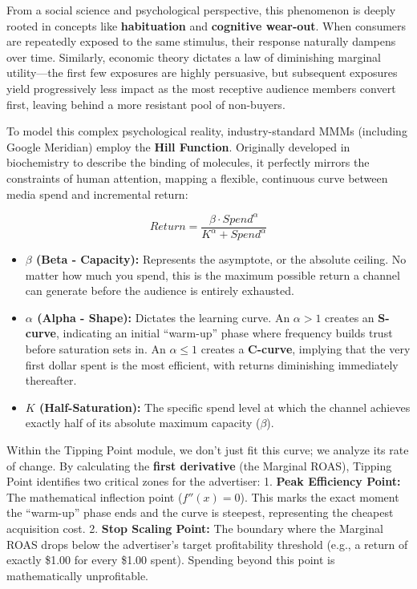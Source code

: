 \documentclass[
]{article}
\providecommand{\tightlist}{%
  \setlength{\itemsep}{0pt}\setlength{\parskip}{0pt}}
\begin{document}
From a social science and psychological perspective, this phenomenon is
deeply rooted in concepts like \textbf{habituation} and
\textbf{cognitive wear-out}. When consumers are repeatedly exposed to
the same stimulus, their response naturally dampens over time.
Similarly, economic theory dictates a law of diminishing marginal
utility---the first few exposures are highly persuasive, but subsequent
exposures yield progressively less impact as the most receptive audience
members convert first, leaving behind a more resistant pool of
non-buyers.

To model this complex psychological reality, industry-standard MMMs
(including Google Meridian) employ the \textbf{Hill Function}.
Originally developed in biochemistry to describe the binding of
molecules, it perfectly mirrors the constraints of human attention,
mapping a flexible, continuous curve between media spend and incremental
return:

\[ Return = \frac{\beta \cdot Spend^\alpha}{K^\alpha + Spend^\alpha} \]

\begin{itemize}
\tightlist
\item
  \textbf{\(\beta\) (Beta - Capacity):} Represents the asymptote, or the
  absolute ceiling. No matter how much you spend, this is the maximum
  possible return a channel can generate before the audience is entirely
  exhausted.
\item
  \textbf{\(\alpha\) (Alpha - Shape):} Dictates the learning curve. An
  \(\alpha > 1\) creates an \textbf{S-curve}, indicating an initial
  ``warm-up'' phase where frequency builds trust before saturation sets
  in. An \(\alpha \le 1\) creates a \textbf{C-curve}, implying that the
  very first dollar spent is the most efficient, with returns
  diminishing immediately thereafter.
\item
  \textbf{\(K\) (Half-Saturation):} The specific spend level at which
  the channel achieves exactly half of its absolute maximum capacity
  (\(\beta\)).
\end{itemize}

Within the Tipping Point module, we don't just fit this curve; we
analyze its rate of change. By calculating the \textbf{first derivative}
(the Marginal ROAS), Tipping Point identifies two critical zones for the
advertiser: 1. \textbf{Peak Efficiency Point:} The mathematical
inflection point (\(f''(x) = 0\)). This marks the exact moment the
``warm-up'' phase ends and the curve is steepest, representing the
cheapest acquisition cost. 2. \textbf{Stop Scaling Point:} The boundary
where the Marginal ROAS drops below the advertiser's target
profitability threshold (e.g., a return of exactly \$1.00 for every
\$1.00 spent). Spending beyond this point is mathematically
unprofitable.
\end{document}
